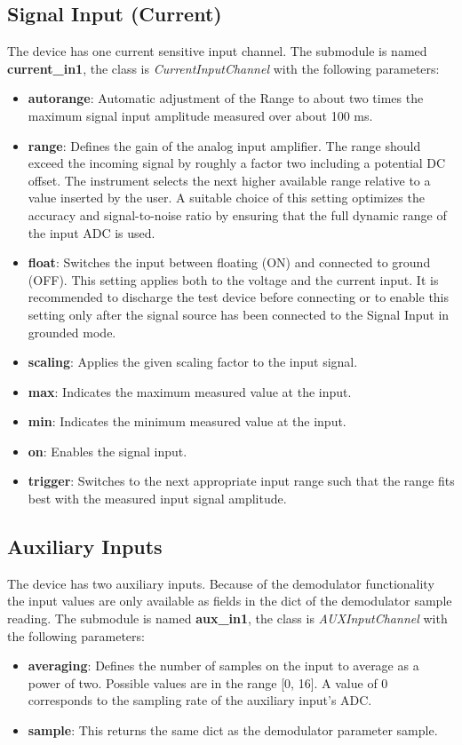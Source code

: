\documentclass[11pt]{article} %
\begin{document}
\subsection{Signal Input (Current)}
The device has one current sensitive input channel. The submodule is named {\bf current\_in1}, the class is {\it CurrentInputChannel} with the following parameters:
\begin{itemize}
\item {\bf autorange}: Automatic adjustment of the Range to about two times the maximum signal input amplitude measured over about 100 ms.
\item {\bf range}: Defines the gain of the analog input amplifier. The range should exceed the incoming signal by roughly a factor two including a potential DC offset. The instrument selects the next higher available range relative to a value inserted by the user. A suitable choice of this setting optimizes the accuracy and signal-to-noise ratio by ensuring that the full dynamic range of the input ADC is used.
\item {\bf float}: Switches the input between floating (ON) and connected to ground (OFF). This setting applies both to the voltage and the current input. It is recommended to discharge the test device before connecting or to enable this setting only after the signal source has been connected to the Signal Input in grounded mode.
\item {\bf scaling}: Applies the given scaling factor to the input signal.
\item {\bf max}: Indicates the maximum measured value at the input.
\item {\bf min}: Indicates the minimum measured value at the input.
\item {\bf on}: Enables the signal input.
\item {\bf trigger}: Switches to the next appropriate input range such that the range fits best with the measured input signal amplitude.
\end{itemize}


\subsection{Auxiliary Inputs}
The device has two auxiliary inputs. Because of the demodulator functionality the input values are only available as fields in the dict of the demodulator sample reading. The submodule is named {\bf aux\_in1}, the class is {\it AUXInputChannel} with the following parameters:
\begin{itemize}
\item {\bf averaging}: Defines the number of samples on the input to average as a power of two. Possible values are in the range [0, 16]. A value of 0 corresponds to the sampling rate of the auxiliary input's ADC.
\item {\bf sample}: This returns the same dict as the demodulator parameter sample.
\end{itemize}
\end{document}
